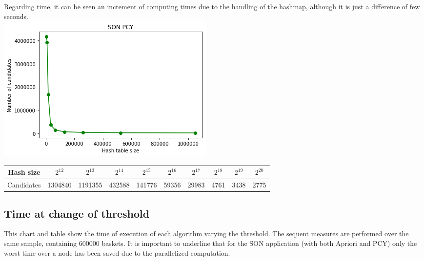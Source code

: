 \documentclass[14pt]{extarticle}
\begin{document}
Regarding time, it can be seen an increment of computing times due to the handling of the hashmap, although it is just a difference of few seconds.\\
\includegraphics[scale=1]{sonpcy_candidates.png}\\
\begin{center}
\hspace*{-1,5cm}
\begin{tabular}{ |c||c|c|c|c|c|c|c|c|c| } 
 \hline
 Hash size & $2^{12}$ & $2^{13}$ & $2^{14}$ & $2^{15}$ & $2^{16}$ & $2^{17}$ & $2^{18}$ & $2^{19}$ & $2^{20}$ \\
 \hline
 Candidates & 1304840 & 1191355 & 432588 & 141776 & 59356 & 29983 &  4761 & 3438 & 2775 \\
 \hline
\end{tabular}
\end{center}
\subsection{Time at change of threshold}
This chart and table show the time of execution of each algorithm varying the threshold. 
The sequent measures are performed over the same sample, containing 600000 baskets.
It is important to underline that for the SON application (with both Apriori and PCY) only the worst time over a node has been saved due to the parallelized computation.\\
\end{document}
